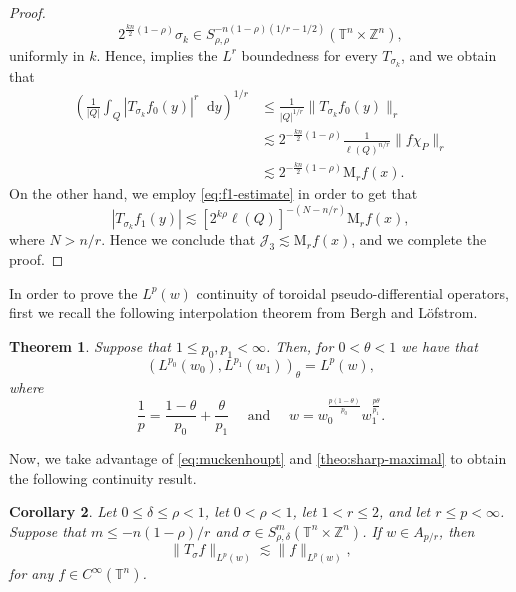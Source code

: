 \documentclass[12pt, reqno]{amsart}
\newtheorem{theorem}{Theorem}[section]
\newtheorem{corollary}[theorem]{Corollary}
\theoremstyle{definition}
\theoremstyle{remark}
\numberwithin{equation}{section}
\newcommand*\diff{\mathop{}\!\mathrm{d}}
\begin{document}
\begin{proof}
    \begin{equation*}
        2^{\frac{kn}{2}(1-\rho)}\sigma_k \in S_{\rho, \rho}^{-n(1-\rho)(1/r-1/2)} (\mathbb{T}^n \times \mathbb{Z}^n),
    \end{equation*}
    uniformly in $k$. Hence, \cite[Theorem~3.11]{Cardona:Martinez} implies the $L^r$ boundedness for every $T_{\sigma_k}$, and we obtain that
    \begin{align*}
        \left( \frac{1}{|Q|}\int_Q |T_{\sigma_k}f_0(y)|^r \diff y
        \right)^{1/r} & \leq \frac{1}{|Q|^{1/r}} \|T_{\sigma_k}f_0(y)\|_r \\
        & \lesssim 2^{-\frac{kn}{2}(1-\rho)} \frac{1}{\ell(Q)^{n/r}} \|f\chi_P\|_r \\
        & \lesssim2^{-\frac{kn}{2}(1-\rho)} \mathrm{M}_rf(x).
    \end{align*}
    On the other hand, we employ \cref{eq:f1-estimate} in order to get that
    \begin{equation*}
        |T_{\sigma_k}f_1(y)| \lesssim[2^{k\rho}\ell(Q)]^{-(N-n/r)} \mathrm{M}_rf(x),
    \end{equation*}
    where $N>n/r$. Hence we conclude that $\mathcal{J}_3 \lesssim\mathrm{M}_rf(x)$, and we complete the proof.
\end{proof}
In order to prove the $L^p(w)$ continuity of toroidal pseudo-differential operators, first we recall the following interpolation theorem from Bergh and L\"ofstrom.
\begin{theorem}
    \cite[Theorem~5.5.3]{bergh-lofstrom} Suppose that $1\leq p_0,p_1<\infty$. Then, for $0<\theta<1$ we have that 
    \begin{equation*}
        (L^{p_0}(w_0), L^{p_1}(w_1))_\theta = L^p(w),
    \end{equation*}
    where 
    \begin{equation*}
        \frac{1}{p} = \frac{1-\theta}{p_0} + \frac{\theta}{p_1} \quad \text{ and } \quad w = w_0^{\frac{p(1-\theta)}{p_0}} w_1^{\frac{p\theta}{p_1}}.
    \end{equation*}
    \label{theo:interpolation}
\end{theorem}
Now, we take advantage of \cref{eq:muckenhoupt} and \cref{theo:sharp-maximal} to obtain the following continuity result.
\begin{corollary}
    Let $0\leq \delta \leq \rho < 1$, let $0<\rho<1$, let $1<r\leq 2$, and let $r\leq p < \infty$. Suppose that $m\leq -n(1-\rho)/r$ and $\sigma\in S^m_{\rho,\delta}(\mathbb{T}^n\times\mathbb{Z}^n)$. If $w \in A_{p/r}$, then 
    \begin{equation*}
        \|T_\sigma f\|_{L^p(w)} \lesssim\|f\|_{L^p(w)},
    \end{equation*}
    for any $f\in C^\infty(\mathbb{T}^n)$.
\end{corollary}
\end{document}
